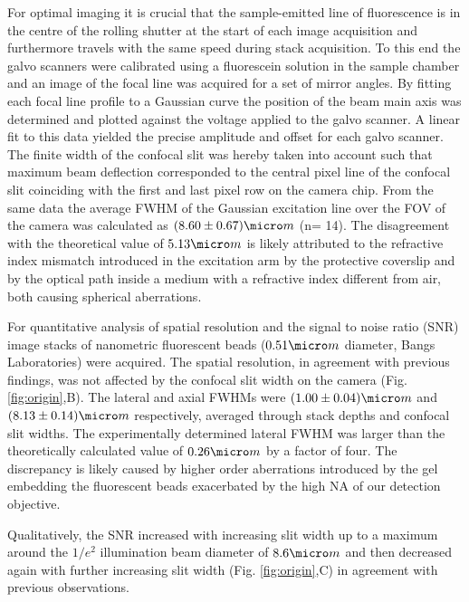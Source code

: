 \documentclass[12pt]{spieman}  %
\begin{document}
\begin{spacing}{2}
For optimal imaging it is crucial that the sample-emitted line of fluorescence is in the centre of the rolling shutter at the start of each image acquisition and furthermore travels with the same speed during stack acquisition. To this end the galvo scanners were calibrated using a fluorescein solution in the sample chamber and an image of the focal line was acquired for a set of mirror angles. By fitting each focal line profile to a Gaussian curve the position of the beam main axis was determined and plotted against the voltage applied to the galvo scanner. A linear fit to this data yielded the precise amplitude and offset for each galvo scanner. The finite width of the confocal slit was hereby taken into account such that maximum beam deflection corresponded to the central pixel line of the confocal slit coinciding with the first and last pixel row on the camera chip. From the same data the average FWHM of the Gaussian excitation line over the FOV of the camera was calculated as $(8.60\pm0.67)\micro m$ (n= 14). The disagreement with the theoretical value of $5.13 \micro m$ is likely attributed to the refractive index mismatch introduced in the excitation arm by the protective coverslip and by the optical path inside a medium with a refractive index different from air, both causing spherical aberrations\cite{Booth2001}.

For quantitative analysis of spatial resolution and the signal to noise ratio (SNR) image stacks of nanometric fluorescent beads ($0.51 \micro m$ diameter, Bangs Laboratories) were acquired. The spatial resolution, in agreement with previous findings\cite{Wilson1987,Cox2004}, was not affected by the confocal slit width on the camera (Fig. \ref{fig:origin},B). The lateral and axial FWHMs were $(1.00\pm0.04) \micro m$ and $(8.13\pm0.14) \micro m$ respectively, averaged through stack depths and confocal slit widths. The experimentally determined lateral FWHM was larger than the theoretically calculated value of $0.26 \micro m$ by a factor of four. The discrepancy is likely caused by higher order aberrations introduced by the gel embedding the fluorescent beads exacerbated by the high NA of our detection objective\cite{Schwertner2004,Schwertner2007}.

Qualitatively, the SNR increased with increasing slit width up to a maximum around the $1/e^2$ illumination beam diameter of $8.6 \micro m$ and then decreased again with further increasing slit width (Fig. \ref{fig:origin},C) in agreement with previous observations\cite{Baumgart2012}.   




\end{spacing}
\end{document}
